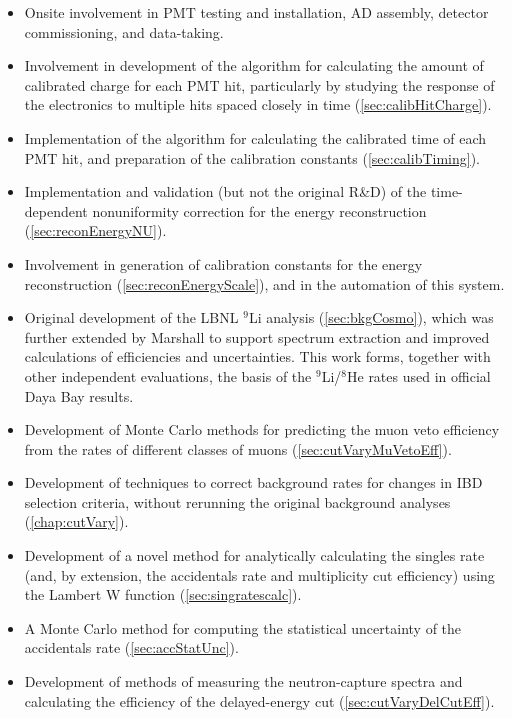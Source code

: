 \documentclass[../thesis.tex]{subfiles}
\begin{document}
\begin{itemize}
\item Onsite involvement in PMT testing and installation, AD assembly, detector commissioning, and data-taking.
\item Involvement in development of the algorithm for calculating the amount of calibrated charge for each PMT hit, particularly by studying the response of the electronics to multiple hits spaced closely in time (\autoref{sec:calibHitCharge}).
\item Implementation of the algorithm for calculating the calibrated time of each PMT hit, and preparation of the calibration constants (\autoref{sec:calibTiming}).
\item Implementation and validation (but not the original R\&D) of the time-dependent nonuniformity correction for the energy reconstruction (\autoref{sec:reconEnergyNU}).
\item Involvement in generation of calibration constants for the energy reconstruction (\autoref{sec:reconEnergyScale}), and in the automation of this system.
\item Original development of the LBNL $^9$Li analysis (\autoref{sec:bkgCosmo}), which was further extended by Marshall \cite{ChrisLi9} to support spectrum extraction and improved calculations of efficiencies and uncertainties. This work forms, together with other independent evaluations, the basis of the $^9$Li/$^8$He rates used in official Daya Bay results.
\item Development of Monte Carlo methods for predicting the muon veto efficiency from the rates of different classes of muons (\autoref{sec:cutVaryMuVetoEff}).
\item Development of techniques to correct background rates for changes in IBD selection criteria, without rerunning the original background analyses (\autoref{chap:cutVary}).
\item Development of a novel method for analytically calculating the singles rate (and, by extension, the accidentals rate and multiplicity cut efficiency) using the Lambert W function (\autoref{sec:singratescalc}).
\item A Monte Carlo method for computing the statistical uncertainty of the accidentals rate (\autoref{sec:accStatUnc}).
\item Development of methods of measuring the neutron-capture spectra and calculating the efficiency of the delayed-energy cut (\autoref{sec:cutVaryDelCutEff}).

\end{itemize}
\end{document}
